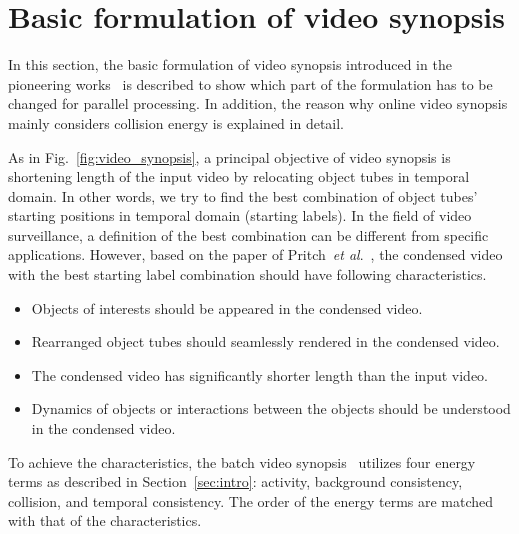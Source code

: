\documentclass[11pt]{hyu_thesis}
\newcommand{\etal}{\textit{et al}.}
\begin{document}
\section{Basic formulation of video synopsis}
\label{sec:basic_form}

In this section, the basic formulation of video synopsis introduced in the pioneering works~\cite{Rav-Acha2006,Pritch2007,Pritch2008} is described to show which part of the formulation has to be changed for parallel processing. In addition, the reason why online video synopsis mainly considers collision energy is explained in detail.

As in Fig.~\ref{fig:video_synopsis}, a principal objective of video synopsis is shortening length of the input video by relocating object tubes in temporal domain. In other words, we try to find the best combination of object tubes' starting positions in temporal domain (starting labels). In the field of video surveillance, a definition of the best combination can be different from specific applications. However, based on the paper of Pritch~\etal~\cite{Pritch2008}, the condensed video with the best starting label combination should have following characteristics.
\begin{itemize}
\item Objects of interests should be appeared in the condensed video.
\item Rearranged object tubes should seamlessly rendered in the condensed video.
\item The condensed video has significantly shorter length than the input video.
\item Dynamics of objects or interactions between the objects should be understood in the condensed video.
\end{itemize}
To achieve the characteristics, the batch video synopsis~\cite{Pritch2008} utilizes four energy terms as described in Section~\ref{sec:intro}: activity, background consistency, collision, and temporal consistency. The order of the energy terms are matched with that of the characteristics.
\end{document}
